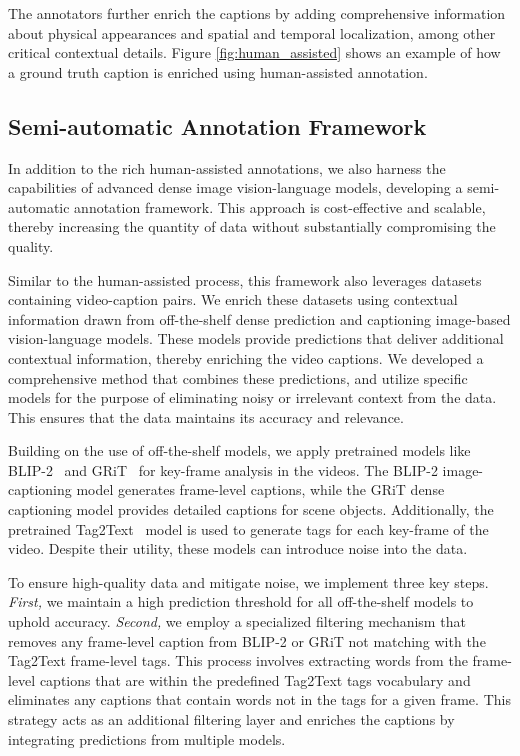 The annotators further enrich the captions by adding comprehensive information about physical appearances and spatial and temporal localization, among other critical contextual details. Figure \ref{fig:human_assisted} shows an example of how a ground truth caption is enriched using human-assisted annotation.  

\subsection{Semi-automatic Annotation Framework} In addition to the rich human-assisted annotations, we also harness the capabilities of advanced dense image vision-language models, developing a semi-automatic annotation framework. This approach is cost-effective and scalable, thereby increasing the quantity of data without substantially compromising the quality.

Similar to the human-assisted process, this framework also leverages datasets containing video-caption pairs. We enrich these datasets using contextual information drawn from off-the-shelf dense prediction and captioning image-based vision-language models. These models provide predictions that deliver additional contextual information, thereby enriching the video captions. We developed a comprehensive method that combines these predictions, and utilize specific models for the purpose of eliminating noisy or irrelevant context from the data. This ensures that the data maintains its accuracy and relevance.

Building on the use of off-the-shelf models, we apply pretrained models like BLIP-2~\cite{blip-2} and GRiT~\cite{wu2022grit} for key-frame analysis in the videos. The BLIP-2 image-captioning model generates frame-level captions, while the GRiT dense captioning model provides detailed captions for scene objects. Additionally, the pretrained Tag2Text~\cite{huang2023tag2text} model is used to generate tags for each key-frame of the video. Despite their utility, these models can introduce noise into the data.

To ensure high-quality data and mitigate noise, we implement three key steps. \emph{First,} we maintain a high prediction threshold for all off-the-shelf models to uphold accuracy. \emph{Second,} we employ a specialized filtering mechanism that removes any frame-level caption from BLIP-2 or GRiT not matching with the Tag2Text frame-level tags. This process involves extracting words from the frame-level captions that are within the predefined Tag2Text tags vocabulary and eliminates any captions that contain words not in the tags for a given frame. This strategy acts as an additional filtering layer and enriches the captions by integrating predictions from multiple models.

